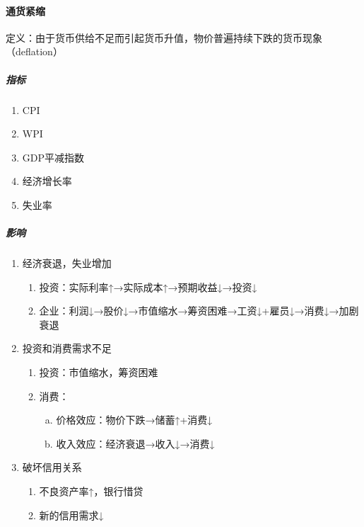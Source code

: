 \documentclass[12pt]{book}
\begin{document}
\paragraph{通货紧缩}





定义：由于货币供给不足而引起货币升值，物价普遍持续下跌的货币现象（deflation）


\subparagraph{指标}

\begin{enumerate}[1.]
  \item CPI
  \item WPI
  \item GDP平减指数
  \item 经济增长率
  \item 失业率
\end{enumerate}



\subparagraph{影响}

\begin{enumerate}[1.]
  \item 经济衰退，失业增加
        \begin{enumerate}[(1)]
          \item 投资：实际利率↑→实际成本↑→预期收益↓→投资↓
          \item 企业：利润↓→股价↓→市值缩水→筹资困难→工资↓+雇员↓→消费↓→加剧衰退
        \end{enumerate}
  \item 投资和消费需求不足
        \begin{enumerate}[(1)]
          \item 投资：市值缩水，筹资困难
          \item 消费：
                \begin{enumerate}[a.]
                  \item 价格效应：物价下跌→储蓄↑+消费↓
                  \item 收入效应：经济衰退→收入↓→消费↓
                \end{enumerate}
        \end{enumerate}
  \item 破坏信用关系
        \begin{enumerate}[(1)]
          \item 不良资产率↑，银行惜贷
          \item 新的信用需求↓
        \end{enumerate}
\end{enumerate}
\end{document}
